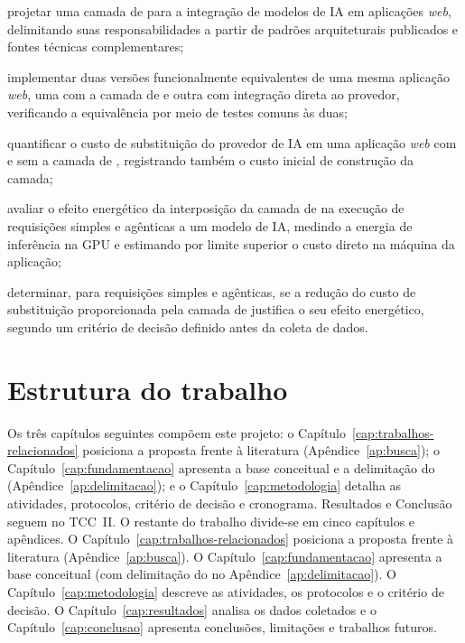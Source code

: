 \begin{alineas}
  \item projetar uma camada de \harness{} para a integração de modelos de IA em
        aplicações \textit{web}, delimitando suas responsabilidades a partir de
        padrões arquiteturais publicados e fontes técnicas complementares;
  \item implementar duas versões funcionalmente equivalentes de uma mesma
        aplicação \textit{web}, uma com a camada de \harness{} e outra com
        integração direta ao provedor, verificando a equivalência por meio de
        testes comuns às duas;
  \item quantificar o custo de substituição do provedor de IA em uma aplicação
        \textit{web} com e sem a camada de \harness{}, registrando também o
        custo inicial de construção da camada;
  \item avaliar o efeito energético da interposição da camada de \harness{} na
        execução de requisições simples e agênticas a um modelo de IA, medindo a
        energia de inferência na GPU e estimando por limite superior o custo
        direto na máquina da aplicação;
  \item determinar, para requisições simples e agênticas, se a redução do custo
        de substituição proporcionada pela camada de \harness{} justifica o seu
        efeito energético, segundo um critério de decisão definido antes da
        coleta de dados.
\end{alineas}

\section{Estrutura do trabalho}
\label{sec:estrutura}

\ifentregaparcial
Os três capítulos seguintes compõem este projeto: o
Capítulo~\ref{cap:trabalhos-relacionados} posiciona a proposta frente à
literatura (Apêndice~\ref{ap:busca}); o Capítulo~\ref{cap:fundamentacao}
apresenta a base conceitual e a delimitação do \harness{}
(Apêndice~\ref{ap:delimitacao}); e o Capítulo~\ref{cap:metodologia} detalha as
atividades, protocolos, critério de decisão e cronograma. Resultados e Conclusão
seguem no TCC~II.
\else
O restante do trabalho divide-se em cinco capítulos e apêndices. O
Capítulo~\ref{cap:trabalhos-relacionados} posiciona a proposta frente à
literatura (Apêndice~\ref{ap:busca}). O Capítulo~\ref{cap:fundamentacao}
apresenta a base conceitual (com delimitação do \harness{} no
Apêndice~\ref{ap:delimitacao}). O Capítulo~\ref{cap:metodologia} descreve as
atividades, os protocolos e o critério de decisão. O
Capítulo~\ref{cap:resultados} analisa os dados coletados e o
Capítulo~\ref{cap:conclusao} apresenta conclusões, limitações e trabalhos
futuros.
\fi
